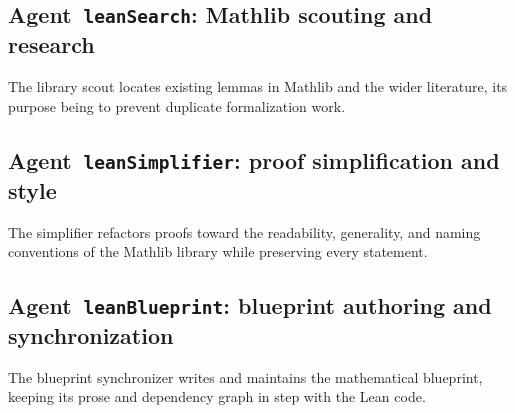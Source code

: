 \subsection{Agent~\texttt{leanSearch}: Mathlib scouting and research}\label{sec:prompt_leansearch}

The library scout locates existing lemmas in Mathlib and the wider literature,
its purpose being to prevent duplicate formalization work.



\subsection{Agent~\texttt{leanSimplifier}: proof simplification and style}\label{sec:prompt_leansimplifier}

The simplifier refactors proofs toward the readability, generality, and naming
conventions of the Mathlib library while preserving every statement.



\subsection{Agent~\texttt{leanBlueprint}: blueprint authoring and synchronization}\label{sec:prompt_leanblueprint}

The blueprint synchronizer writes and maintains the mathematical blueprint,
keeping its prose and dependency graph in step with the Lean code.


